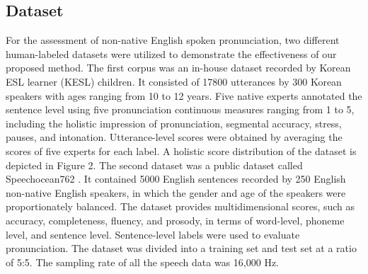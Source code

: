 \documentclass[a4paper]{article}
\begin{document}
\subsection{Dataset}
For the assessment of non-native English spoken pronunciation, two different human-labeled datasets were utilized to demonstrate the effectiveness of our proposed method. The first corpus was an in-house dataset recorded by Korean ESL learner (KESL) children. It consisted of 17800 utterances by 300 Korean speakers with ages ranging from 10 to 12 years. Five native experts annotated the sentence level using five pronunciation continuous measures ranging from 1 to 5, including the holistic impression of pronunciation, segmental accuracy, stress, pauses, and intonation. Utterance-level scores were obtained by averaging the scores of five experts for each label. A holistic score distribution of the dataset is depicted in Figure 2. The second dataset was a public dataset called Speechocean762 \cite{zhang2021speechocean762}. It contained 5000 English sentences recorded by 250 English non-native English speakers, in which the gender and age of the speakers were proportionately balanced. The dataset provides multidimensional scores, such as accuracy, completeness, fluency, and prosody, in terms of word-level, phoneme level, and sentence level. Sentence-level labels were used to evaluate pronunciation. The dataset was divided into a training set and test set at a ratio of 5:5. The sampling rate of all the speech data was 16,000 Hz.
\end{document}
